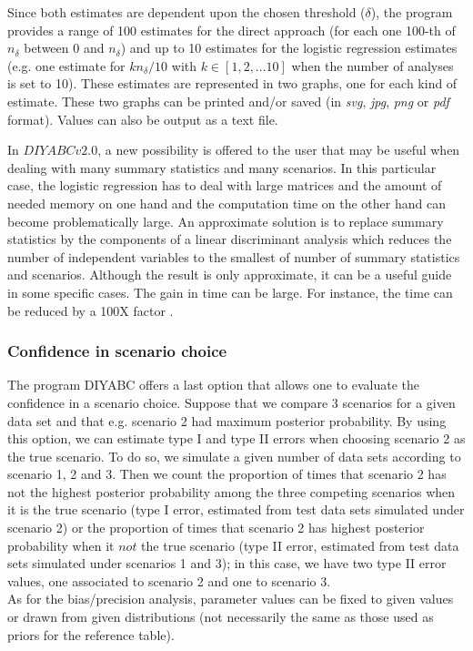 Since both estimates are dependent upon the chosen threshold ($\delta$), the program provides a range of 100 estimates for the direct approach (for each one 100-th of $n_{\delta}$ between 0 and $n_{\delta}$) and up to 10 estimates for the logistic regression estimates (e.g. one estimate for $kn_{\delta}/10$ with $k \in[1,2,...10]$ when the number of analyses is set to 10). These estimates are represented in two graphs, one for each kind of estimate. These two graphs can be printed and/or saved (in \emph{svg}, \emph{jpg}, \emph{png} or \emph{pdf} format). Values can also be output as a text file.\

In $DIYABCv2.0$, a new possibility is offered to the user that may be useful when dealing with many summary statistics and many scenarios. In this particular case, the logistic regression has to deal with large matrices and the amount of needed memory on one hand and the computation time on the other hand can become problematically large. An approximate solution is to replace summary statistics by the components of a linear discriminant analysis which reduces the number of independent variables to the smallest of number of summary statistics and scenarios. Although the result is only approximate, it can be a useful guide in some specific cases. The gain in time can be large. For instance, the time can be reduced by a 100X factor \citep{EL2012}. \\

\subsubsection{Confidence in scenario choice}
The program DIYABC offers a last option that allows one to evaluate the confidence in a scenario choice. Suppose that we compare 3 scenarios for a given data set and that e.g. scenario 2 had maximum posterior probability. By using this option, we can estimate type I and type II errors when choosing scenario 2 as the true scenario. To do so, we simulate a given number of data sets according to scenario 1, 2 and 3. Then we count the proportion of times that scenario 2 has not the highest posterior probability among the three competing scenarios when it is the true scenario (type I error, estimated from test data sets simulated under scenario 2) or the proportion of times that scenario 2 has highest posterior probability when it $not$ the true scenario (type II error, estimated from test data sets simulated under scenarios 1 and 3); in this case, we have two type II error values, one associated to scenario 2 and one to scenario 3.\\

As for the bias/precision analysis, parameter values can be fixed to given values or drawn from given distributions (not necessarily the same as those used as priors for the reference table).

\clearpage
